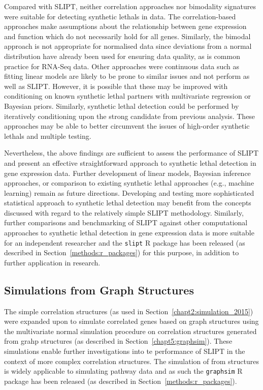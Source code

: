 Compared with \gls{SLIPT}, neither correlation approaches nor bimodality signatures were suitable for detecting \glspl{synthetic lethal} in  data. The correlation-based approaches make assumptions about the relationship between \gls{gene expression} and function which do not necessarily hold for all genes. Similarly, the bimodal approach is not appropriate for normalised data since deviations from a normal distribution have already been used for ensuring data quality, as is common practice for \gls{RNA-Seq} data. Other approaches were continuous data such as fitting linear models are likely to be prone to similar issues and not perform as well as \gls{SLIPT}. However, it is possible that these may be improved with conditioning on known \gls{synthetic lethal} partners with multivariate regression or Bayesian priors. Similarly, \gls{synthetic lethal} detection could be performed by iteratively conditioning upon the strong candidate from previous analysis. These approaches may be able to better circumvent the issues of high-order \glspl{synthetic lethal} and multiple testing. 

Nevertheless, the above findings are sufficient to assess the performance of \gls{SLIPT} and present an effective straightforward approach to \gls{synthetic lethal} detection in \gls{gene expression} data. Further development of linear models, Bayesian inference approaches, or comparison to existing \gls{synthetic lethal} approaches (e.g., machine learning) remain as future directions. Developing and testing more sophisticated statistical approach to \gls{synthetic lethal} detection may benefit from the concepts discussed with regard to the relatively simple \gls{SLIPT} methodology. Similarly, further comparisons and benchmarking of \gls{SLIPT} against other computational approaches to \gls{synthetic lethal} detection in \gls{gene expression} data is more suitable for an independent researcher and the \texttt{slipt} R package has been released (as described in Section~\ref{methods:r_packages}) for this purpose, in addition to further application in research.


\subsection{Simulations from Graph Structures}

The simple correlation structures (as used in Section~\ref{chapt2:simulation_2015}) were expanded upon to simulate correlated genes based on \gls{graph} structures using the multivariate normal simulation procedure on correlation structures generated from grahp structures (as described in Section~\ref{chapt5:graphsim}). These simulations enable further investigations into te performance of \gls{SLIPT} in the context of more complex correlation structures. The simulation of  from  structures is widely applicable to simulating pathway  data and as such the \texttt{graphsim} R package has been released (as described in Section~\ref{methods:r_packages}).

